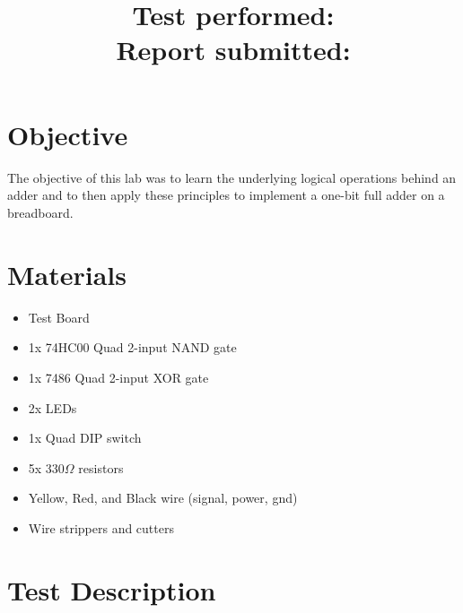 \documentclass[10pt]{article}
\title{
    \textbf{\courseTitle} \\
    \textbf{\documentTitle} \\
    \bigskip
    \textbf{\large{Test performed: \testDate}} \\
    \textbf{\large{Report submitted: \reportDate}} \\
    \bigskip
    \bigskip
}
\author{\documentAuthor}
\date{}
\begin{document}
\maketitle

\newpage

\section{Objective}

The objective of this lab was to learn the underlying logical operations behind an adder and to then apply these principles to implement a one-bit full adder on a breadboard. 

\medskip



\section{Materials}

\begin{itemize}
	\item Test Board
	\item 1x 74HC00 Quad 2-input NAND gate
	\item 1x 7486 Quad 2-input XOR gate
	\item 2x LEDs
	\item 1x Quad DIP switch
	\item 5x 330$\Omega$ resistors
	\item Yellow, Red, and Black wire (signal, power, gnd)
	\item Wire strippers and cutters
\end{itemize}

\medskip


\section{Test Description}
\end{document}
